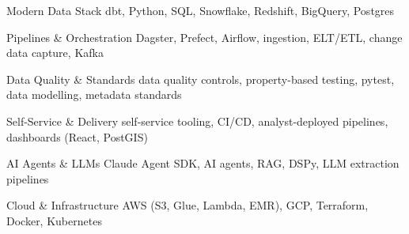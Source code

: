 
\begin{cvskills}

  \cvskill
    {Modern Data Stack}
    {dbt, Python, SQL, Snowflake, Redshift, BigQuery, Postgres}

  \cvskill
    {Pipelines \& Orchestration}
    {Dagster, Prefect, Airflow, ingestion, ELT/ETL, change data capture, Kafka}

  \cvskill
    {Data Quality \& Standards}
    {data quality controls, property-based testing, pytest, data modelling, metadata standards}

  \cvskill
    {Self-Service \& Delivery}
    {self-service tooling, CI/CD, analyst-deployed pipelines, dashboards (React, PostGIS)}

  \cvskill
    {AI Agents \& LLMs}
    {Claude Agent SDK, AI agents, RAG, DSPy, LLM extraction pipelines}

  \cvskill
    {Cloud \& Infrastructure}
    {AWS (S3, Glue, Lambda, EMR), GCP, Terraform, Docker, Kubernetes}

\end{cvskills}
